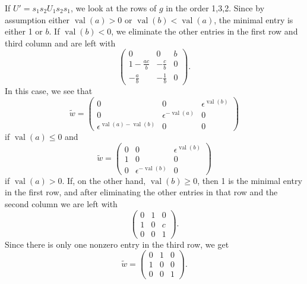 \documentclass{amsart}
\theoremstyle{definition}
\def\e{\epsilon}
\def\w{\widetilde{w}}
\def\val{\mathop{\mathrm{val}}}
\begin{document}
  If $U' = s_1s_2 U_1 s_2s_1$, we look at the rows of $g$ in the order 1,3,2.
  Since by assumption either $\val(a) > 0$ or $\val(b) < \val(a)$, the minimal
  entry is either 1 or $b$.  If $\val(b) < 0$, we eliminate the other entries
  in the first row and third column and are left with
  \begin{equation}\label{eq:w2-row1-b-less-zero}
    \begin{pmatrix}
      0 & 0 & b \\
      1-\frac{ac}{b} & -\frac{c}{b} & 0 \\
      -\frac{a}{b} & -\frac{1}{b} & 0
    \end{pmatrix}.
  \end{equation}
  In this case, we see that
  \begin{equation*}
    \w = \begin{pmatrix}
      0 & 0 & \e^{\val(b)} \\
      0 & \e^{-\val(a)} & 0  \\
      \e^{\val(a)-\val(b)} & 0 & 0
    \end{pmatrix}
  \end{equation*}
  if $\val(a) \le 0$ and 
  \begin{equation*}
    \w = \begin{pmatrix}
      0 & 0 & \e^{\val(b)} \\
      1 & 0 & 0  \\
      0 & \e^{-\val(b)} & 0
    \end{pmatrix}
  \end{equation*}
  if $\val(a) > 0$.  If, on the other hand, $\val(b) \ge 0$, then 1 is the
  minimal entry in the first row, and after eliminating the other entries in
  that row and the second column we are left with
  \begin{equation}\label{eq:w2-row1-b-ge-zero}
    \begin{pmatrix}
      0 & 1 & 0 \\
      1 & 0 & c \\
      0 & 0 & 1
    \end{pmatrix}.
  \end{equation}
  Since there is only one nonzero entry in the third row, we get 
  \begin{equation*}\w = \begin{pmatrix}
      0 & 1 & 0 \\
      1 & 0 & 0 \\
      0 & 0 & 1
    \end{pmatrix}.
  \end{equation*}
\end{document}
